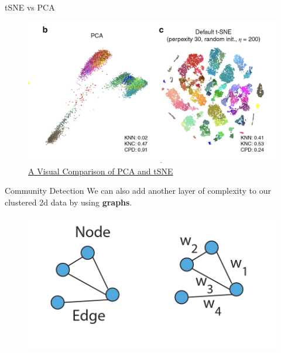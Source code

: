 \documentclass{beamer}
\begin{document}
\begin{frame}{tSNE vs PCA}
	
		\begin{figure}[h]
		\centering
		\includegraphics[scale=0.55]{../../Figures/pca_vs_tsne.png}
		\caption{\href{https://doi.org/10.1038/s41467-019-13056-x}{A Visual Comparison of PCA and tSNE}}
	\end{figure}	
	
	
\end{frame}
	
\begin{frame}{Community Detection}
	We can also add another layer of complexity to our clustered 2d data by using {\bf graphs}.
		\begin{figure}[h]
	\centering
	\includegraphics[scale=0.45]{../../Figures/graph_notation.png}
\end{figure}
	 
\end{frame}
	
\end{document}
